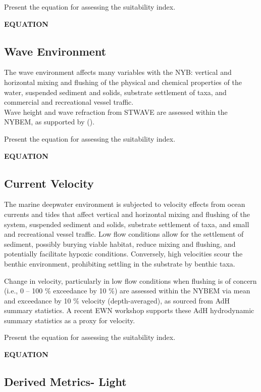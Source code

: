 \documentclass[
]{book}
\begin{document}
Present the equation for assessing the suitability index.

\textbf{EQUATION}

\hypertarget{wave-environment}{%
\subsection{Wave Environment}\label{wave-environment}}

The wave environment affects many variables with the NYB: vertical and horizontal mixing and flushing of the physical and chemical properties of the water, suspended sediment and solids, substrate settlement of taxa, and commercial and recreational vessel traffic.\\
Wave height and wave refraction from STWAVE are assessed within the NYBEM, as supported by (\citet{byrnes_effects_2004}).

Present the equation for assessing the suitability index.

\textbf{EQUATION}

\hypertarget{current-velocity}{%
\subsection{Current Velocity}\label{current-velocity}}

The marine deepwater environment is subjected to velocity effects from ocean currents and tides that affect vertical and horizontal mixing and flushing of the system, suspended sediment and solids, substrate settlement of taxa, and small and recreational vessel traffic. Low flow conditions allow for the settlement of sediment, possibly burying viable habitat, reduce mixing and flushing, and potentially facilitate hypoxic conditions. Conversely, high velocities scour the benthic environment, prohibiting settling in the substrate by benthic taxa.

Change in velocity, particularly in low flow conditions when flushing is of concern (i.e., 0 -- 100 \% exceedance by 10 \%) are assessed within the NYBEM via mean and exceedance by 10 \% velocity (depth-averaged), as sourced from AdH summary statistics. A recent EWN workshop supports these AdH hydrodynamic summary statistics as a proxy for velocity.

Present the equation for assessing the suitability index.

\textbf{EQUATION}

\hypertarget{derived-metrics--light}{%
\subsection{Derived Metrics- Light}\label{derived-metrics--light}}
\end{document}
